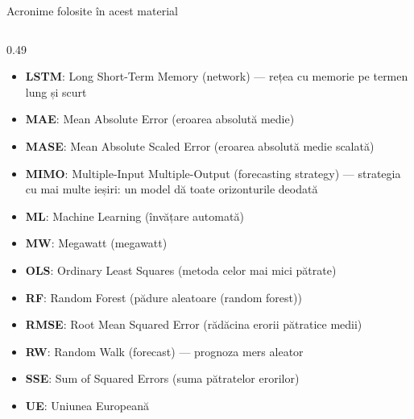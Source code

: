 \begin{frame}{Acronime folosite în acest material}
\begin{columns}[T]
\begin{column}{0.49\textwidth}
\begin{itemize}\setlength{\itemsep}{0pt}
    \item \textbf{LSTM}: Long Short-Term Memory (network) — rețea cu memorie pe termen lung și scurt
    \item \textbf{MAE}: Mean Absolute Error (eroarea absolută medie)
    \item \textbf{MASE}: Mean Absolute Scaled Error (eroarea absolută medie scalată)
    \item \textbf{MIMO}: Multiple-Input Multiple-Output (forecasting strategy) — strategia cu mai multe ieșiri: un model dă toate orizonturile deodată
    \item \textbf{ML}: Machine Learning (învățare automată)
    \item \textbf{MW}: Megawatt (megawatt)
    \item \textbf{OLS}: Ordinary Least Squares (metoda celor mai mici pătrate)
    \item \textbf{RF}: Random Forest (pădure aleatoare (random forest))
    \item \textbf{RMSE}: Root Mean Squared Error (rădăcina erorii pătratice medii)
    \item \textbf{RW}: Random Walk (forecast) — prognoza mers aleator
    \item \textbf{SSE}: Sum of Squared Errors (suma pătratelor erorilor)
    \item \textbf{UE}: Uniunea Europeană
\end{itemize}
\end{column}
\end{columns}
\end{frame}

